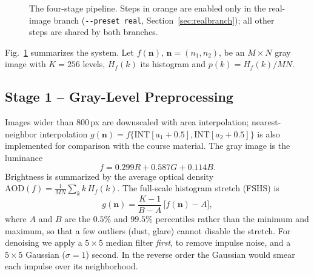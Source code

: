 \documentclass[conference,a4paper]{IEEEtran}
\newcommand{\cfg}[1]{\texttt{#1}}
\begin{document}
\begin{figure}[!t]
\caption{The four-stage pipeline. Steps in \textcolor{realc}{orange} are enabled only in the real-image branch (\cfg{-{}-preset real}, Section~\ref{sec:realbranch}); all other steps are shared by both branches.}
\label{fig:pipeline}
\end{figure}

Fig.~\ref{fig:pipeline} summarizes the system. Let $f(\mathbf{n})$, $\mathbf{n}=(n_1,n_2)$, be an $M\times N$ gray image with $K=256$ levels, $H_f(k)$ its histogram and $p(k)=H_f(k)/MN$.

\subsection{Stage 1 -- Gray-Level Preprocessing}
Images wider than 800\,px are downscaled with area interpolation; nearest-neighbor interpolation $g(\mathbf{n})=f\{\mathrm{INT}[a_1+0.5],\mathrm{INT}[a_2+0.5]\}$ is also implemented for comparison with the course material. The gray image is the luminance
\begin{equation}
f = 0.299R + 0.587G + 0.114B .
\end{equation}
Brightness is summarized by the average optical density $\mathrm{AOD}(f)=\frac{1}{MN}\sum_k k\,H_f(k)$. The full-scale histogram stretch (FSHS) is
\begin{equation}
g(\mathbf{n}) = \frac{K-1}{B-A}\,\bigl[f(\mathbf{n})-A\bigr],
\label{eq:fshs}
\end{equation}
where $A$ and $B$ are the $0.5\%$ and $99.5\%$ percentiles rather than the minimum and maximum, so that a few outliers (dust, glare) cannot disable the stretch. For denoising we apply a $5\times5$ median filter \emph{first}, to remove impulse noise, and a $5\times5$ Gaussian ($\sigma=1$) second. In the reverse order the Gaussian would smear each impulse over its neighborhood.
\end{document}
